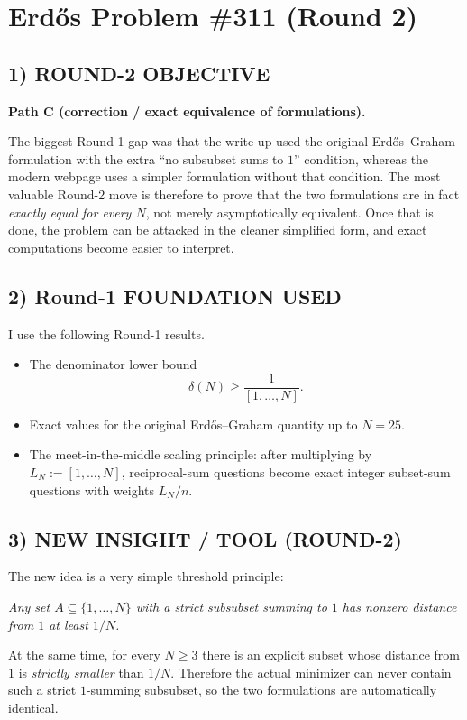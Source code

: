 \section{Erd\H{o}s Problem \#311 (Round 2)}

\subsection*{1) ROUND-2 OBJECTIVE}
\textbf{Path C (correction / exact equivalence of formulations).}

The biggest Round-1 gap was that the write-up used the original Erd\H{o}s--Graham formulation with the extra ``no subsubset sums to $1$'' condition, whereas the modern webpage uses a simpler formulation without that condition. The most valuable Round-2 move is therefore to prove that the two formulations are in fact \emph{exactly equal for every $N$}, not merely asymptotically equivalent. Once that is done, the problem can be attacked in the cleaner simplified form, and exact computations become easier to interpret.

\subsection*{2) Round-1 FOUNDATION USED}
I use the following Round-1 results.

\begin{itemize}
\item The denominator lower bound
\[
\delta(N)\ge \frac{1}{[1,\ldots,N]}.
\]
\item Exact values for the original Erd\H{o}s--Graham quantity up to $N=25$.
\item The meet-in-the-middle scaling principle: after multiplying by $L_N:=[1,\ldots,N]$, reciprocal-sum questions become exact integer subset-sum questions with weights $L_N/n$.
\end{itemize}

\subsection*{3) NEW INSIGHT / TOOL (ROUND-2)}
The new idea is a very simple threshold principle:

\medskip
\centerline{\emph{Any set $A\subseteq\{1,\ldots,N\}$ with a strict subsubset summing to $1$ has nonzero distance from $1$ at least $1/N$.}}
\medskip

At the same time, for every $N\ge 3$ there is an explicit subset whose distance from $1$ is \emph{strictly smaller} than $1/N$. Therefore the actual minimizer can never contain such a strict $1$-summing subsubset, so the two formulations are automatically identical.

